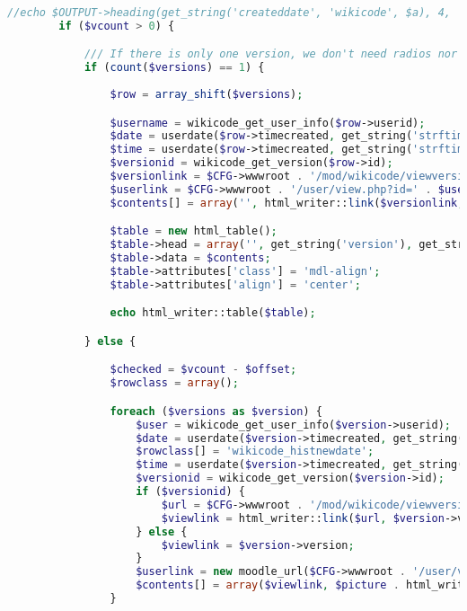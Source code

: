 \begin{lstlisting}[language=PHP]
        //echo $OUTPUT->heading(get_string('createddate', 'wikicode', $a), 4, 'wikicode_headingtime');
        if ($vcount > 0) {

            /// If there is only one version, we don't need radios nor forms
            if (count($versions) == 1) {
	
                $row = array_shift($versions);

                $username = wikicode_get_user_info($row->userid);
                $date = userdate($row->timecreated, get_string('strftimedate', 'langconfig'));
                $time = userdate($row->timecreated, get_string('strftimetime', 'langconfig'));
                $versionid = wikicode_get_version($row->id);
                $versionlink = $CFG->wwwroot . '/mod/wikicode/viewversion.php?pageid=' . $pageid . '&versionid=' . $versionid->id;
                $userlink = $CFG->wwwroot . '/user/view.php?id=' . $username->id;
                $contents[] = array('', html_writer::link($versionlink, $row->version), $picture . html_writer::link($userlink, fullname($username)), $time);

                $table = new html_table();
                $table->head = array('', get_string('version'), get_string('user'), get_string('modified'), '');
                $table->data = $contents;
                $table->attributes['class'] = 'mdl-align';
				$table->attributes['align'] = 'center';

                echo html_writer::table($table);

            } else {

                $checked = $vcount - $offset;
                $rowclass = array();

                foreach ($versions as $version) {
                    $user = wikicode_get_user_info($version->userid);
                    $date = userdate($version->timecreated, get_string('strftimedate'));
                    $rowclass[] = 'wikicode_histnewdate';
                    $time = userdate($version->timecreated, get_string('strftimetime', 'langconfig'));
                    $versionid = wikicode_get_version($version->id);
                    if ($versionid) {
                        $url = $CFG->wwwroot . '/mod/wikicode/viewversion.php?pageid=' . $pageid . '&versionid=' . $versionid->id;
                        $viewlink = html_writer::link($url, $version->version);
                    } else {
                        $viewlink = $version->version;
                    }
                    $userlink = new moodle_url($CFG->wwwroot . '/user/view.php', array('id' => $version->userid));
                    $contents[] = array($viewlink, $picture . html_writer::link($userlink->out(false), fullname($user)), $time, "");
                }


\end{lstlisting}

